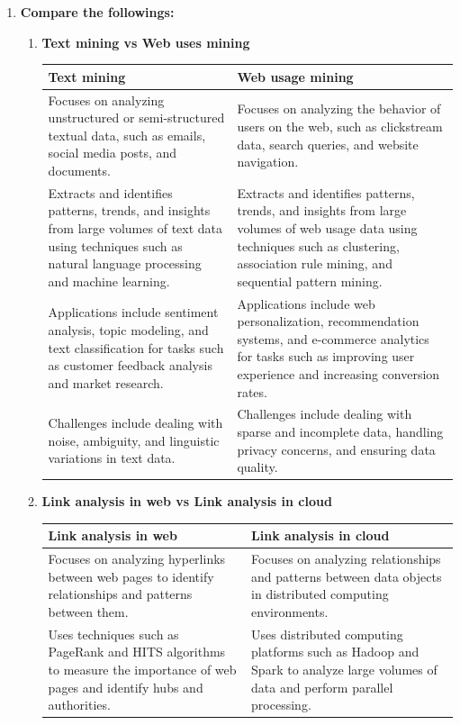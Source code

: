 \documentclass[12pt]{article}
\begin{document}
\begin{enumerate}
\item{\bfseries Compare the followings:}
\begin{enumerate}
    \item {\bfseries Text mining vs Web uses mining}
    \begin{longtable}{|L{6cm}|L{6cm}|}
        \hline
        \textbf{Text mining} & \textbf{Web usage mining} \\
        \hline
        Focuses on analyzing unstructured or semi-structured textual data, such as emails, social media posts, and documents. & Focuses on analyzing the behavior of users on the web, such as clickstream data, search queries, and website navigation. \\
        \hline
        Extracts and identifies patterns, trends, and insights from large volumes of text data using techniques such as natural language processing and machine learning. & Extracts and identifies patterns, trends, and insights from large volumes of web usage data using techniques such as clustering, association rule mining, and sequential pattern mining. \\
        \hline
        Applications include sentiment analysis, topic modeling, and text classification for tasks such as customer feedback analysis and market research. & Applications include web personalization, recommendation systems, and e-commerce analytics for tasks such as improving user experience and increasing conversion rates. \\
        \hline
        Challenges include dealing with noise, ambiguity, and linguistic variations in text data. & Challenges include dealing with sparse and incomplete data, handling privacy concerns, and ensuring data quality. \\
        \hline
        \end{longtable}
    \item {\bfseries  Link analysis in web vs Link analysis in cloud}
    \begin{longtable}{|p{6cm}|p{6cm}|}
        \hline
        \textbf{Link analysis in web} & \textbf{Link analysis in cloud} \\
        \hline
        Focuses on analyzing hyperlinks between web pages to identify relationships and patterns between them. & Focuses on analyzing relationships and patterns between data objects in distributed computing environments. \\
        \hline
        Uses techniques such as PageRank and HITS algorithms to measure the importance of web pages and identify hubs and authorities. & Uses distributed computing platforms such as Hadoop and Spark to analyze large volumes of data and perform parallel processing. \\

\end{longtable}
\end{enumerate}
\end{enumerate}
\end{document}
